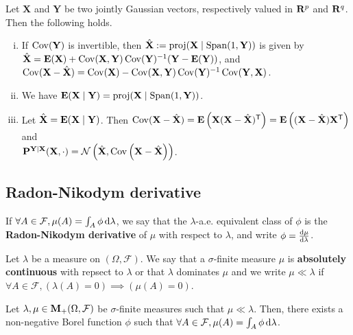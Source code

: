 	\begin{pop}
		Let $\mathbf{X}$ and $\mathbf{Y}$ be two jointly Gaussian vectors, respectively valued in $\mathbf{R}^p$ and $\mathbf{R}^q$.
		Then the following holds.
		\begin{enumerate}[(i)]
			\item
				If $\operatorname{Cov}(\mathbf{Y})$ is invertible, then $\hat{\mathbf{X}} := \operatorname{proj}(\mathbf{X} \mid \operatorname{Span}(1,\mathbf{Y}))$ is given by
				$\hat{\mathbf{X}} = \mathbf{E}(\mathbf{X}) + \operatorname{Cov}(\mathbf{X},\mathbf{Y}) \operatorname{Cov}(\mathbf{Y})^{-1} (\mathbf{Y} - \mathbf{E}(\mathbf{Y}))$, and
				$\operatorname{Cov}(\mathbf{X} - \hat{\mathbf{X}}) = \operatorname{Cov}(\mathbf{X}) - \operatorname{Cov}(\mathbf{X}, \mathbf{Y}) \operatorname{Cov}(\mathbf{Y})^{-1} \operatorname{Cov}(\mathbf{Y},\mathbf{X})$.
			\item We have $\mathbf{E}(\mathbf{X} \mid \mathbf{Y}) = \operatorname{proj}(\mathbf{X} \mid \operatorname{Span}(1,\mathbf{Y}))$.
			\item Let $\hat{\mathbf{X}} = \mathbf{E}(\mathbf{X} \mid \mathbf{Y})$.
				Then $\operatorname{Cov}(\mathbf{X} - \hat{\mathbf{X}}) = \mathbf{E} \left( \mathbf{X}(\mathbf{X} - \hat{\mathbf{X}})^\mathsf{T} \right) = \mathbf{E} \left( (\mathbf{X} - \hat{\mathbf{X}}) \mathbf{X}^\mathsf{T} \right)$
				and\\ $\mathbf{P}^{\mathbf{Y} \mid \mathbf{X}}(\mathbf{X},\cdot) = \mathcal{N} \left( \hat{\mathbf{X}}, \operatorname{Cov} \left( \mathbf{X} - \hat{\mathbf{X}} \right) \right)$.
		\end{enumerate}
	\end{pop}


\subsection{Radon-Nikodym derivative}

	\begin{defn}
		If $\forall A \in \mathcal{F}, \mu(A) = \int_A \phi \mathop{}\mathopen{}\mathrm{d} \lambda$, we say that the $\lambda$-a.e. equivalent class of $\phi$ is the \textbf{Radon-Nikodym derivative} of $\mu$ with respect to $\lambda$, and write $\phi = \frac{\mathop{}\mathopen{}\mathrm{d} \mu}{\mathop{}\mathopen{}\mathrm{d} \lambda}$.
	\end{defn}

	\begin{defn}
		Let $\lambda$ be a measure on $(\Omega,\mathcal{F})$.
		We say that a $\sigma$-finite measure $\mu$ is \textbf{absolutely continuous} with repsect to $\lambda$ or that $\lambda$ dominates $\mu$ and we write $\mu \ll \lambda$ if $\forall A \in \mathcal{F}, (\lambda(A) = 0) \implies (\mu(A) = 0)$.
	\end{defn}
	
	\begin{thm}
		Let $\lambda, \mu \in \mathbf{M}_+(\Omega,\mathcal{F})$ be $\sigma$-finite measures such that $\mu \ll \lambda$.
		Then, there exists a non-negative Borel function $\phi$ such that $\forall A \in \mathcal{F}, \mu(A) = \int_A \phi \mathop{}\mathopen{}\mathrm{d} \lambda$.
	\end{thm}
	
